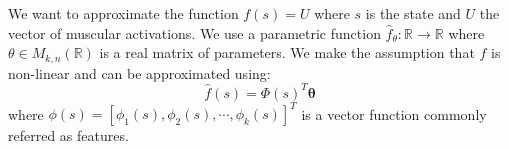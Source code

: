 \documentclass[pdftex,a4paper,11pt]{report}
\begin{document}
We want to approximate the function $f(s) = U$ where $s$ is the state and $U$ the vector of muscular activations.
We use a parametric function $\hat{f}_\theta: \mathbb{R} \rightarrow \mathbb{R}$ where $\theta \in M_{k,n}(\mathbb{R})$ is a real matrix of parameters. We make the assumption that $f$ is non-linear and can be approximated using:
\begin{equation}
	\hat{f}(s) = \Phi(s)^T\boldsymbol{\theta}
\end{equation}
where  
$\phi(s) = [\phi_1(s), \phi_2(s), \cdots, \phi_k(s)]^T$
is a vector function commonly referred as features.
\end{document}
